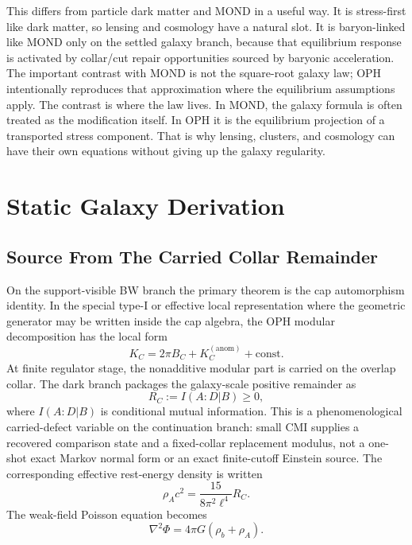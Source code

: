 \documentclass[11pt]{article}
\begin{document}
This differs from particle dark matter and MOND in a useful way.  It is
stress-first like dark matter, so lensing and cosmology have a natural slot.
It is baryon-linked like MOND only on the settled galaxy branch, because that
equilibrium response is activated by collar/cut repair opportunities sourced by
baryonic acceleration.  The important contrast with MOND is not the
square-root galaxy law; OPH intentionally reproduces that approximation where
the equilibrium assumptions apply.  The contrast is where the law lives.  In
MOND, the galaxy formula is often treated as the modification itself.  In OPH
it is the equilibrium projection of a transported stress component.  That is
why lensing, clusters, and cosmology can have their own equations without
giving up the galaxy regularity.

\section{Static Galaxy Derivation}

\subsection{Source From The Carried Collar Remainder}

On the support-visible BW branch the primary theorem is the cap automorphism identity. In the
special type-I or effective local representation where the geometric generator may be written
inside the cap algebra, the OPH modular decomposition has the local form
\begin{equation}
  K_C = 2\pi B_C + K_C^{(\mathrm{anom})}+\mathrm{const}.
\end{equation}
At finite regulator stage, the nonadditive modular part is carried on the
overlap collar.  The dark branch packages the galaxy-scale positive remainder
as
\begin{equation}
  R_C := I(A:D|B)\ge 0,
\end{equation}
where \(I(A:D|B)\) is conditional mutual information.  This is a
phenomenological carried-defect variable on the continuation branch: small CMI
supplies a recovered comparison state and a fixed-collar replacement modulus,
not a one-shot exact Markov normal form or an exact finite-cutoff Einstein
source. The corresponding
effective rest-energy density is written
\begin{equation}
  \rho_A c^2
    = \frac{15}{8\pi^2\ell^4} R_C.
  \label{eq:rhoA}
\end{equation}
The weak-field Poisson equation becomes
\begin{equation}
  \nabla^2 \Phi = 4\pi G(\rho_b+\rho_A).
  \label{eq:poisson}
\end{equation}
\end{document}
